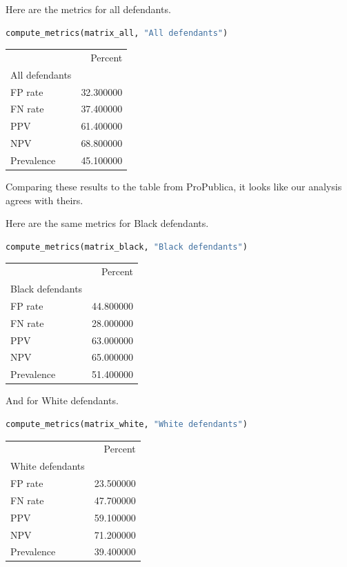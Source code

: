 Here are the metrics for all defendants.

\begin{lstlisting}[language=Python,style=source]
compute_metrics(matrix_all, "All defendants")
\end{lstlisting}

\begin{tabular}{lr}
\midrule
 & Percent \\
All defendants &  \\
\midrule
FP rate & 32.300000 \\
FN rate & 37.400000 \\
PPV & 61.400000 \\
NPV & 68.800000 \\
Prevalence & 45.100000 \\
\midrule
\end{tabular}

Comparing these results to the table from ProPublica, it looks like our
analysis agrees with theirs.

Here are the same metrics for Black defendants.

\begin{lstlisting}[language=Python,style=source]
compute_metrics(matrix_black, "Black defendants")
\end{lstlisting}

\begin{tabular}{lr}
\midrule
 & Percent \\
Black defendants &  \\
\midrule
FP rate & 44.800000 \\
FN rate & 28.000000 \\
PPV & 63.000000 \\
NPV & 65.000000 \\
Prevalence & 51.400000 \\
\midrule
\end{tabular}

And for White defendants.

\begin{lstlisting}[language=Python,style=source]
compute_metrics(matrix_white, "White defendants")
\end{lstlisting}

\begin{tabular}{lr}
\midrule
 & Percent \\
White defendants &  \\
\midrule
FP rate & 23.500000 \\
FN rate & 47.700000 \\
PPV & 59.100000 \\
NPV & 71.200000 \\
Prevalence & 39.400000 \\
\midrule
\end{tabular}

